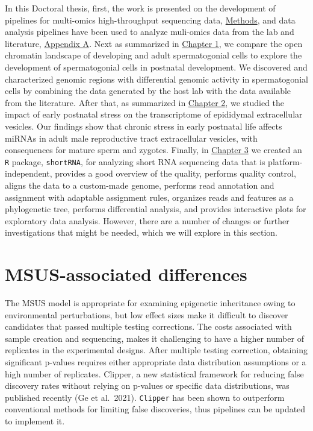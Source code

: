 \documentclass[12pt,twoside]{reedthesis}
\begin{document}
In this Doctoral thesis, first, the work is presented on the development of pipelines for multi-omics high-throughput sequencing data, \protect\hyperlink{methods}{Methods}, and data analysis pipelines have been used to analyze muli-omics data from the lab and literature, \protect\hyperlink{aa}{Appendix A}. Next as summarized in \protect\hyperlink{chapter1}{Chapter 1}, we compare the open chromatin landscape of developing and adult spermatogonial cells to explore the development of spermatogonial cells in postnatal development. We discovered and characterized genomic regions with differential genomic activity in spermatogonial cells by combining the data generated by the host lab with the data available from the literature. After that, as summarized in \protect\hyperlink{chapter2}{Chapter 2}, we studied the impact of early postnatal stress on the transcriptome of epididymal extracellular vesicles. Our findings show that chronic stress in early postnatal life affects miRNAs in adult male reproductive tract extracellular vesicles, with consequences for mature sperm and zygotes. Finally, in \protect\hyperlink{chapter3}{Chapter 3} we created an \texttt{R} package, \texttt{shortRNA}, for analyzing short RNA sequencing data that is platform-independent, provides a good overview of the quality, performs quality control, aligns the data to a custom-made genome, performs read annotation and assignment with adaptable assignment rules, organizes reads and features as a phylogenetic tree, performs differential analysis, and provides interactive plots for exploratory data analysis. However, there are a number of changes or further investigations that might be needed, which we will explore in this section.

\hypertarget{msus-associated-differences}{%
\section*{MSUS-associated differences}\label{msus-associated-differences}}

The MSUS model is appropriate for examining epigenetic inheritance owing to environmental perturbations, but low effect sizes make it difficult to discover candidates that passed multiple testing corrections. The costs associated with sample creation and sequencing, makes it challenging to have a higher number of replicates in the experimental designs. After multiple testing correction, obtaining significant p-values requires either appropriate data distribution assumptions or a high number of replicates. Clipper, a new statistical framework for reducing false discovery rates without relying on p-values or specific data distributions, was published recently (Ge et al.~2021). \texttt{Clipper} has been shown to outperform conventional methods for limiting false discoveries, thus pipelines can be updated to implement it.
\end{document}
